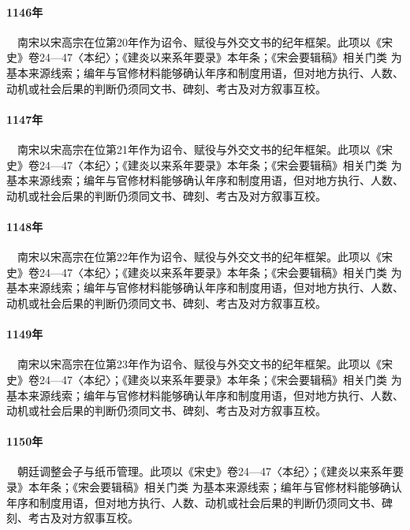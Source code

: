 \paragraph{1146年}　南宋以宋高宗在位第20年作为诏令、赋役与外交文书的纪年框架。此项以《宋史》卷24—47〈本纪〉；《建炎以来系年要录》本年条；《宋会要辑稿》相关门类 为基本来源线索；编年与官修材料能够确认年序和制度用语，但对地方执行、人数、动机或社会后果的判断仍须同文书、碑刻、考古及对方叙事互校。

\paragraph{1147年}　南宋以宋高宗在位第21年作为诏令、赋役与外交文书的纪年框架。此项以《宋史》卷24—47〈本纪〉；《建炎以来系年要录》本年条；《宋会要辑稿》相关门类 为基本来源线索；编年与官修材料能够确认年序和制度用语，但对地方执行、人数、动机或社会后果的判断仍须同文书、碑刻、考古及对方叙事互校。

\paragraph{1148年}　南宋以宋高宗在位第22年作为诏令、赋役与外交文书的纪年框架。此项以《宋史》卷24—47〈本纪〉；《建炎以来系年要录》本年条；《宋会要辑稿》相关门类 为基本来源线索；编年与官修材料能够确认年序和制度用语，但对地方执行、人数、动机或社会后果的判断仍须同文书、碑刻、考古及对方叙事互校。

\paragraph{1149年}　南宋以宋高宗在位第23年作为诏令、赋役与外交文书的纪年框架。此项以《宋史》卷24—47〈本纪〉；《建炎以来系年要录》本年条；《宋会要辑稿》相关门类 为基本来源线索；编年与官修材料能够确认年序和制度用语，但对地方执行、人数、动机或社会后果的判断仍须同文书、碑刻、考古及对方叙事互校。

\paragraph{1150年}　朝廷调整会子与纸币管理。此项以《宋史》卷24—47〈本纪〉；《建炎以来系年要录》本年条；《宋会要辑稿》相关门类 为基本来源线索；编年与官修材料能够确认年序和制度用语，但对地方执行、人数、动机或社会后果的判断仍须同文书、碑刻、考古及对方叙事互校。

